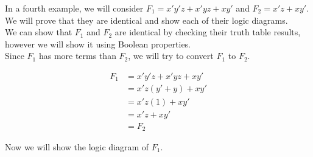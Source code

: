\documentclass[]{article}
\begin{document}
In a fourth example, we will consider $F_1 = x'y'z + x'yz + xy'$ and $F_2 = x'z + xy'$. We will prove that they are identical and show each of their logic diagrams.\\

We can show that $F_1$ and $F_2$ are identical by checking their truth table results, however we will show it using Boolean properties.\\

Since $F_1$ has more terms than $F_2$, we will try to convert $F_1$ to $F_2$.

\begin{align*}
	F_1 &= x'y'z + x'yz + xy'\\
	&= x'z(y'+ y) + xy'\\
	&= x'z(1) + xy'\\
	&= x'z+xy'\\
	&= F_2
\end{align*}\bigbreak

Now we will show the logic diagram of $F_1$.
\end{document}
